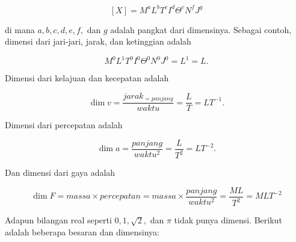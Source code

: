\documentclass[12pt, a4paper]{article}\usepackage[utf8]{inputenc}
\theoremstyle{plain}
\theoremstyle{plain}
\numberwithin{equation}{section}
\theoremstyle{definition}
\begin{document}
	\begin{equation*}
		\left[X\right] = M^a L^b T^c I^d \Theta^e N^f J^g
	\end{equation*}
	
	di mana $a, b, c, d, e, f,$ dan $g$ adalah pangkat dari dimensinya. Sebagai contoh, dimensi dari jari-jari, jarak, dan ketinggian adalah
	
	\vspace{-.5em}
	\begin{equation*}
		M^0 L^1 T^0 I^0 \Theta^0 N^0 J^0 = L^1 = L.
	\end{equation*}
	
	Dimensi dari kelajuan dan kecepatan adalah
	
	\vspace{-.5em}
	\begin{equation*}
		\dim v = \frac{jarak_{=panjang}}{waktu} = \frac{L}{T} = LT^{-1}.
	\end{equation*}
	
	Dimensi dari percepatan adalah
	
	\vspace{-.5em}
	\begin{equation*}
		\dim a = \frac{panjang}{waktu^2} = \frac{L}{T^2} = LT^{-2}.
	\end{equation*}
	
	Dan dimensi dari gaya adalah
	
	\begin{equation*}
		\dim F = massa \times percepatan = massa \times \frac{panjang}{waktu^2} = \frac{ML}{T^2} = MLT^{-2}
	\end{equation*}
	
	Adapun bilangan real seperti $0, 1, \sqrt{2},$ dan $\pi$ tidak punya dimensi. Berikut adalah beberapa besaran dan dimensinya:
	
\end{document}
